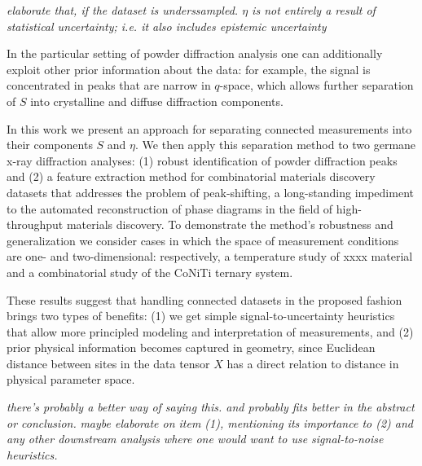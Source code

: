 \documentclass[12pt]{iopart}
\begin{document}

\emph{elaborate that, if the dataset is underssampled. $\eta$ is not entirely a result of statistical uncertainty; i.e. it also includes epistemic uncertainty}

In the particular setting of powder diffraction analysis one can additionally exploit other prior information about the data: for example, the signal is concentrated in peaks that are narrow in $q$-space, which allows further separation of $S$ into crystalline and diffuse diffraction components.


In this work we present an approach for separating connected
measurements into their components $S$ and $\eta$. We then apply this
separation method to two germane x-ray diffraction analyses: (1) robust
identification of powder diffraction peaks and (2) a feature extraction
method for combinatorial materials discovery datasets that addresses the
problem of peak-shifting, a long-standing impediment to the automated
reconstruction of phase diagrams in the field of high-throughput
materials discovery. To demonstrate the method's robustness and generalization we
consider cases in which the space of measurement conditions are one- and
two-dimensional: respectively, a temperature study of xxxx material and
a combinatorial study of the CoNiTi ternary system.

These results suggest that handling connected datasets in the proposed fashion
brings two types of benefits: (1) we get simple signal-to-uncertainty
heuristics that allow more principled modeling and interpretation of
measurements, and (2) prior physical information becomes captured in
geometry, since Euclidean distance between sites in the data tensor $X$
has a direct relation to distance in physical parameter space.

\emph{there's probably a better way of saying this. and probably fits better in the abstract or conclusion.}
\emph{maybe elaborate on item (1), mentioning its importance to (2) and any other downstream analysis where one would want to use signal-to-noise heuristics.}
\end{document}
